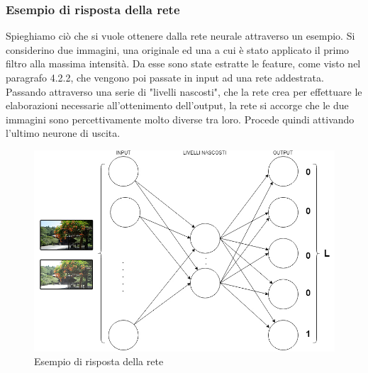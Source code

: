 \documentclass[a4paper,11pt]{article}
\begin{document}
    \subsubsection{Esempio di risposta della rete}
    Spieghiamo ciò che si vuole ottenere dalla rete neurale attraverso un esempio. Si considerino due immagini, una originale ed una a cui è stato applicato il primo filtro alla massima intensità.
    Da esse sono state estratte le feature, come visto nel paragrafo 4.2.2, che vengono poi passate in input ad una rete addestrata.
    Passando attraverso una serie di "livelli nascosti", che la rete crea per effettuare le elaborazioni necessarie all'ottenimento dell'output,
    la rete si accorge che le due immagini sono percettivamente molto diverse tra loro. Procede quindi attivando l'ultimo neurone di uscita.
    \begin{figure}[h]
        \centering
        \includegraphics[scale=0.4]{reteneurale}
        \caption{Esempio di risposta della rete}
    \end{figure}

    \newpage
\end{document}
